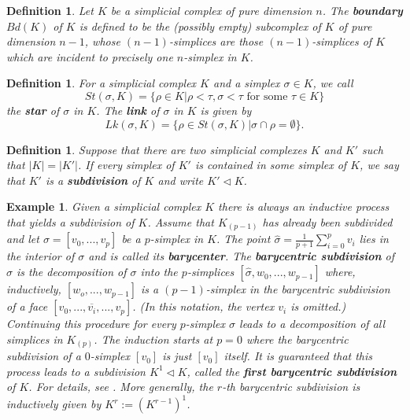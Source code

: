 \documentclass{scrreprt}
\newtheorem{definition}[prop]{Definition}
\newtheorem{example}[prop]{Example}
\begin{document}
\begin{definition}
Let $K$ be a simplicial complex of pure dimension $n$. The \textbf{boundary} $Bd(K)$ of $K$ is defined to be the (possibly empty) subcomplex of $K$ of pure dimension $n-1$, whose $(n-1)$-simplices are those $(n-1)$-simplices of $K$ which are incident to precisely one $n$-simplex in $K$.
\end{definition}

\begin{definition}
For a simplicial complex $K$ and a simplex $\sigma \in K$, we call
\begin{equation*}
St(\sigma,K)= \{ \rho \in K | \rho < \tau, \sigma < \tau \text{ for some } \tau \in K \}  
\end{equation*}
the \textbf{star} of $\sigma$ in $K$. The \textbf{link} of $\sigma$ in $K$ is given by
\begin{equation*}
Lk(\sigma,K) = \{ \rho \in St(\sigma,K) | \sigma \cap \rho = \emptyset \}.
\end{equation*}
\end{definition}

\begin{definition}
Suppose that there are two simplicial complexes $K$ and $K'$ such that $|K| = |K'|$. If every simplex of $K'$ is contained in some simplex of $K$, we say that $K'$ is a \textbf{subdivision} of $K$ and write $K' \lhd K$.
\end{definition}


\begin{example}
Given a simplicial complex $K$ there is always an inductive process that yields a subdivision of $K$. Assume that $K_{(p-1)}$ has already been subdivided and let $\sigma=[v_0,...,v_p]$ be a $p$-simplex in $K$. The point $\hat{\sigma}=\frac{1}{p+1} \sum_{i=0}^p v_i$ lies in the interior of $\sigma$ and is called its \textbf{barycenter}. The \textbf{barycentric subdivision} of $\sigma$ is the decomposition of $\sigma$ into the $p$-simplices $[\hat{\sigma},w_0,...,w_{p-1}]$ where, inductively, $[w_o,...,w_{p-1}]$ is a $(p-1)$-simplex in the barycentric subdivision of a face $[v_0,...,\overline{v_i},...,v_p]$. (In this notation, the vertex $v_i$ is omitted.) Continuing this procedure for every $p$-simplex $\sigma$ leads to a decomposition of all simplices in $K_{(p)}$. The induction starts at $p=0$ where the barycentric subdivision of a $0$-simplex $[v_0]$ is just $[v_0]$ itself. It is guaranteed that this process leads to a subdivision $K^1 \lhd K$, called the \textbf{first barycentric subdivision} of $K$. For details, see \cite{hatcher}. More generally, the $r$-th barycentric subdivision is inductively given by $K^r:=(K^{r-1})^1$.
\end{example}
\end{document}
